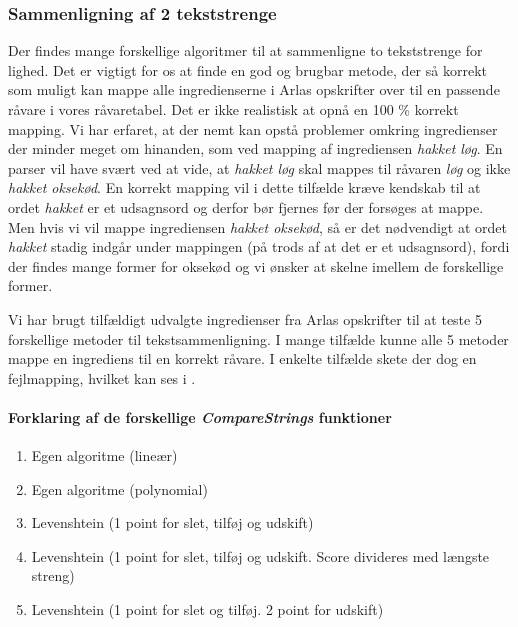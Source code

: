 \subsubsection{Sammenligning af 2 tekststrenge}
Der findes mange forskellige algoritmer til at sammenligne to tekststrenge for lighed. Det er vigtigt for os at finde en god og brugbar metode, der så korrekt som muligt kan mappe alle ingredienserne i Arlas opskrifter over til en passende råvare i vores råvaretabel. Det er ikke realistisk at opnå en 100 \% korrekt mapping. Vi har erfaret, at der nemt kan opstå problemer omkring ingredienser der minder meget om hinanden, som \fx ved mapping af ingrediensen \textit{hakket løg}. En parser vil have svært ved at vide, at \textit{hakket løg} skal mappes til råvaren \textit{løg} og ikke \textit{hakket oksekød}. En korrekt mapping vil i dette tilfælde kræve kendskab til at ordet \textit{hakket} er et udsagnsord og derfor bør fjernes før der forsøges at mappe. Men hvis vi vil mappe ingrediensen \textit{hakket oksekød}, så er det nødvendigt at ordet \textit{hakket} stadig indgår under mappingen (på trods af at det er et udsagnsord), fordi der findes mange former for oksekød og vi ønsker at skelne imellem de forskellige former.

Vi har brugt tilfældigt udvalgte ingredienser fra Arlas opskrifter til at teste 5 forskellige metoder til tekstsammenligning. I mange tilfælde kunne alle 5 metoder mappe en ingrediens til en korrekt råvare. I enkelte tilfælde skete der dog en fejlmapping, hvilket kan ses i .

\paragraph{Forklaring af de forskellige \textit{CompareStrings} funktioner}
\begin{enumerate}
\item Egen algoritme (lineær)
\item Egen algoritme (polynomial)
\item Levenshtein (1 point for slet, tilføj og udskift) %
\item Levenshtein (1 point for slet, tilføj og udskift. Score divideres med længste streng) %
\item Levenshtein (1 point for slet og tilføj. 2 point for udskift) %
\end{enumerate}


